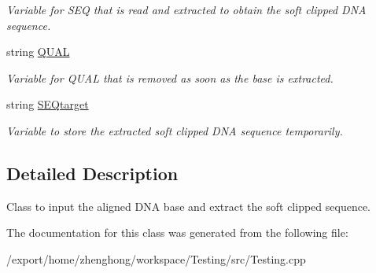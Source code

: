 \begin{DoxyCompactItemize}
\begin{DoxyCompactList}\small\item\em Variable for S\+E\+Q that is read and extracted to obtain the soft clipped D\+N\+A sequence. \end{DoxyCompactList}\item 
\hypertarget{class_input_s_e_q_a5b604ab8af0e9aa20a684e007a50f537}{string \hyperlink{class_input_s_e_q_a5b604ab8af0e9aa20a684e007a50f537}{Q\+U\+A\+L}}\label{class_input_s_e_q_a5b604ab8af0e9aa20a684e007a50f537}

\begin{DoxyCompactList}\small\item\em Variable for Q\+U\+A\+L that is removed as soon as the base is extracted. \end{DoxyCompactList}\item 
\hypertarget{class_input_s_e_q_a69c43cbf03776745425777fd5d9bb202}{string \hyperlink{class_input_s_e_q_a69c43cbf03776745425777fd5d9bb202}{S\+E\+Qtarget}}\label{class_input_s_e_q_a69c43cbf03776745425777fd5d9bb202}

\begin{DoxyCompactList}\small\item\em Variable to store the extracted soft clipped D\+N\+A sequence temporarily. \end{DoxyCompactList}\end{DoxyCompactItemize}


\subsection{Detailed Description}
Class to input the aligned D\+N\+A base and extract the soft clipped sequence. 

The documentation for this class was generated from the following file\+:\begin{DoxyCompactItemize}
\item 
/export/home/zhenghong/workspace/\+Testing/src/Testing.\+cpp\end{DoxyCompactItemize}
